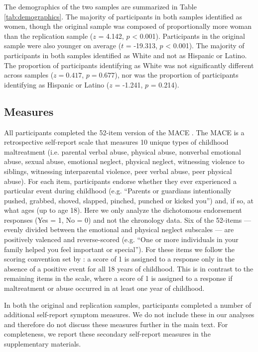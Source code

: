 \documentclass[letterpaper,man,natbib,floatsintext,longtable]{apa6}
\begin{document}
The demographics of the two samples are summarized in Table \ref{tab:demographics}. The majority of participants in both samples identified as women, though the original sample was composed of proportionally more woman than the replication sample ($z$ = 4.142, $p$ < 0.001). Participants in the original sample were also younger on average ($t$ = -19.313, $p$ < 0.001). The majority of participants in both samples identified as White and not as Hispanic or Latino. The proportion of participants identifying as White was not significantly different across samples ($z = 0.417$, $p = 0.677$), nor was the proportion of participants identifying as Hispanic or Latino ($z$ = -1.241, $p$ = 0.214).

\subsection{Measures}

All participants completed the 52-item version of the MACE \citep{teicher2015maltreatment}. The MACE is a retrospective self-report scale that measures 10 unique types of childhood maltreatment (i.e. parental verbal abuse, physical abuse, nonverbal emotional abuse, sexual abuse, emotional neglect, physical neglect, witnessing violence to siblings, witnessing interparental violence, peer verbal abuse, peer physical abuse). For each item, participants endorse whether they ever experienced a particular event during childhood (e.g. ``Parents or guardians intentionally pushed, grabbed, shoved, slapped, pinched, punched or kicked you'') and, if so, at what ages (up to age 18). Here we only analyze the dichotomous endorsement responses (Yes = 1, No = 0) and not the chronology data. Six of the 52-items --- evenly divided between the emotional and physical neglect subscales --- are positively valenced and reverse-scored (e.g. ``One or more individuals in your family helped you feel important or special''). For these items we follow the scoring convention set by \cite{teicher2015maltreatment}: a score of 1 is assigned to a response only in the absence of a positive event for all 18 years of childhood. This is in contrast to the remaining items in the scale, where a score of 1 is assigned to a response if maltreatment or abuse occurred in at least one year of childhood.

In both the original and replication samples, participants completed a number of additional self-report symptom measures. We do not include these in our analyses and therefore do not discuss these measures further in the main text. For completeness, we report these secondary self-report measures in the supplementary materials. 
\end{document}
